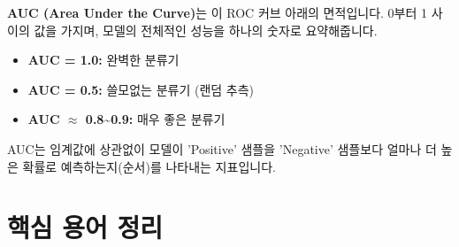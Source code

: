 \documentclass[11pt,a4paper]{book}
\theoremstyle{definition}
\begin{document}
\textbf{AUC (Area Under the Curve)}는 이 ROC 커브 아래의 면적입니다.
0부터 1 사이의 값을 가지며, 모델의 전체적인 성능을 하나의 숫자로 요약해줍니다.

\begin{itemize}
  \item \textbf{AUC = 1.0:} 완벽한 분류기
  \item \textbf{AUC = 0.5:} 쓸모없는 분류기 (랜덤 추측)
  \item \textbf{AUC $\approx$ 0.8\textasciitilde{}0.9:} 매우 좋은 분류기
\end{itemize}
AUC는 임계값에 상관없이 모델이 'Positive' 샘플을 'Negative' 샘플보다 얼마나 더 높은 확률로 예측하는지(순서)를 나타내는 지표입니다.


\section{핵심 용어 정리}
\end{document}
